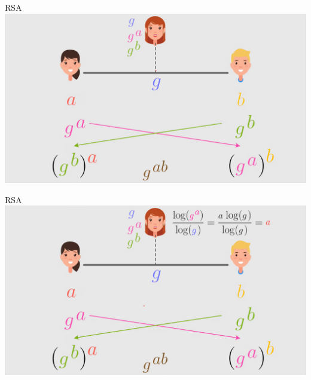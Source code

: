 \documentclass{beamer}
\begin{document}
\begin{frame}{RSA}
    \centering
    \includegraphics[width=\textwidth, height=0.9\textheight, keepaspectratio]{rsa 7.png}
\end{frame}

\begin{frame}{RSA}
    \centering
    \includegraphics[width=\textwidth, height=0.9\textheight, keepaspectratio]{rsa 8.png}
\end{frame}
\end{document}
